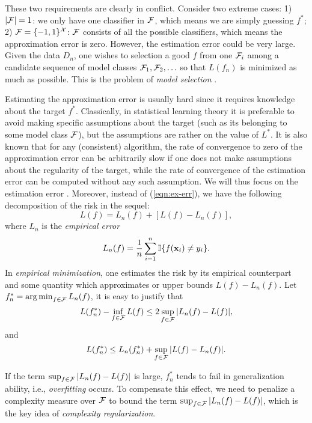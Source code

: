 These two requirements are clearly in conflict. Consider two extreme
cases: 1) $|{\cal F}| = 1$: we only have one classifier in ${\cal F}$, which means we
are simply guessing $f^*$; 2) ${\cal F} = \{-1,1\}^{{\cal X}}$: ${\cal F}$ consists of all the
possible classifiers, which means the approximation error is zero.
However, the estimation error could be very large. Given the data $D_n$,
one wishes to selection a good $f$ from one ${\cal F}_i$ among a candidate
sequence of model classes ${\cal F}_1,{\cal F}_2,\ldots$ so that $L(f_n)$ is minimized
as much as possible. This is the problem of {\em model selection}
\cite{ml/BartlettBL02}.

Estimating the approximation error is usually hard since it requires
knowledge about the target $f^*$. Classically, in statistical learning theory
it is preferable to avoid making specific assumptions about the target (such
as its belonging to some model class ${\cal F}$), but the assumptions are rather
on the value of $L^*$. It is also known that for any (consistent) algorithm,
the rate of convergence to zero of the approximation error can be
arbitrarily slow if one does not make assumptions about the regularity of
the target, while the rate of convergence of the estimation error can be
computed without any such assumption. We will thus focus on the
estimation error \cite{ac/BousquetBL03}. Moreover, instead of
(\ref{eqn:ex-err}), we have the following decomposition of the risk in the
sequel:
\begin{equation}
L(f) = L_n(f) + [L(f) - L_n(f)], \label{eqn:err-dcmp}
\end{equation}
where $L_n$ is the {\em empirical error}
\begin{equation}
L_n(f) = \frac{1}{n} \sum_{i=1}^n \i\{f(\x_i) \neq y_i\}. \label{eqn:emp-err}
\end{equation}
In {\em empirical minimization}, one estimates the risk by its empirical
counterpart and some quantity which approximates or upper bounds $L(f)
- L_n(f)$. Let $f_n^* = \argmin_{f \in \f} L_n(f)$, it is easy to justify that
\cite{esiam/BousquetBL05}
\[
L(f^*_n) - \inf_{f \in {\cal F}}L(f) \leq 2\sup_{f \in {\cal F}}|L_n(f) - L(f)|,
\]
 and
\begin{equation}
L(f^*_n) \leq L_n(f^*_n) + \sup_{f \in \f} |L(f) - L_n(f)|. \label{eqn:upper-bound}
\end{equation}

If the term $\sup_{f \in {\cal F}}|L_n(f) - L(f)|$ is large, $f^*_n$ tends to fail in
generalization ability, i.e., {\em overfitting} occurs. To compensate this
effect, we need to penalize a complexity measure over ${\cal F}$ to bound the
term $\sup_{f \in {\cal F}}|L_n(f) - L(f)|$, which is the key idea of {\em
complexity regularization}.


